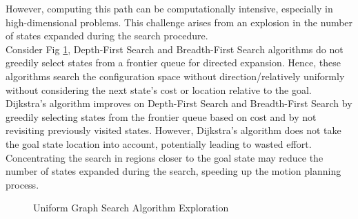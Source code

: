\documentclass[twoside]{article}
\begin{document}
However, computing this path can be computationally intensive, especially in high-dimensional problems. This challenge arises from an explosion in the number of states expanded during the search procedure. \\

Consider Fig \ref{fig:graph_search}, Depth-First Search and Breadth-First Search algorithms do not greedily select states from a frontier queue for directed expansion. Hence, these algorithms search the configuration space without direction/relatively uniformly without considering the next state's cost or location relative to the goal. Dijkstra's algorithm improves on Depth-First Search and Breadth-First Search by greedily selecting states from the frontier queue based on cost and by not revisiting previously visited states. However, Dijkstra's algorithm does not take the goal state location into account, potentially leading to wasted effort. Concentrating the search in regions closer to the goal state may reduce the number of states expanded during the search, speeding up the motion planning process.

\begin{figure}[h]
\begin{center}
\caption{Uniform Graph Search Algorithm Exploration}
\label{fig:graph_search}
\end{center}
\end{figure}
\end{document}
